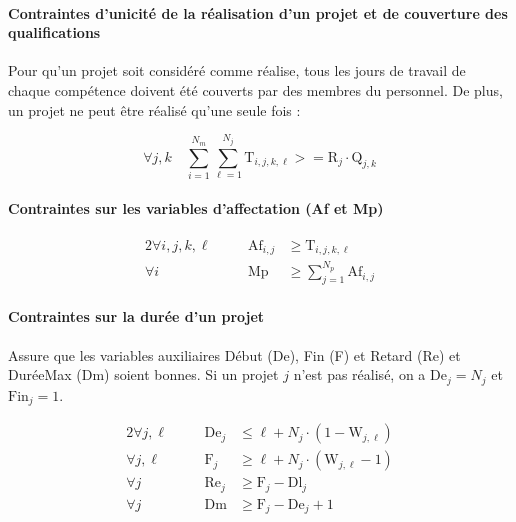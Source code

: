 \documentclass[12pt, a4paper, french, version=last, parskip=half, titlepage]{scrartcl}
\begin{document}

\paragraph{Contraintes d’unicité de la réalisation d’un projet et de couverture des qualifications}
Pour qu'un projet soit considéré comme réalise, tous les jours de travail de chaque compétence doivent été couverts par des membres du personnel. De plus, un projet ne peut être réalisé qu'une seule fois :

\begin{equation*}
    \forall j,k\quad \sum_{i=1}^{N_m} \sum_{\ell=1}^{N_j} \text{T}_{i,j,k,\ell} >= \text{R}_{j}\cdot\text{Q}_{j,k}
\end{equation*}

\paragraph{Contraintes sur les variables d'affectation (Af et Mp)}

\begin{alignat*}{2}
    \forall i,j,k,\ell \quad&& \text{Af}_{i,j} &\ge \text{T}_{i,j,k,\ell} \\
    \forall i          \quad&& \text{Mp}       &\ge \sum_{j=1}^{N_p} \text{Af}_{i, j}
\end{alignat*}

\paragraph{Contraintes sur la durée d'un projet}
Assure que les variables auxiliaires Début (De), Fin (F) et Retard (Re) et DuréeMax (Dm) soient bonnes.
Si un projet $j$ n'est pas réalisé, on a $\text{De}_j = N_j$ et $\text{Fin}_j = 1$.

\begin{alignat*}{2}
    \forall j,\ell \quad&& \text{De}_j &\le \ell + N_j \cdot (1-\text{W}_{j, \ell}) \\
    \forall j, \ell \quad&& \text{F}_j  &\ge \ell + N_j \cdot (\text{W}_{j, \ell} - 1)  \\
    \forall j          \quad&& \text{Re}_j &\ge \text{F}_j - \text{Dl}_j \\
    \forall j          \quad&& \text{Dm}   &\ge \text{F}_j - \text{De}_j + 1
\end{alignat*}
\end{document}
